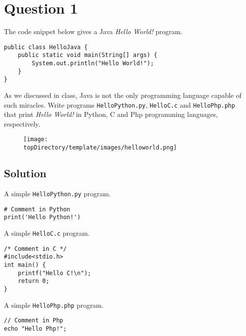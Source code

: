 %
%
%
%

\section*{Question 1}
The code snippet below gives a Java \textit{Hello World!} program.
\lstset{language=Java}
\begin{lstlisting}
public class HelloJava {
	public static void main(String[] args) {
		System.out.println("Hello World!");
	}
}
\end{lstlisting}
As we discussed in class, Java is not the only programming language capable of such miracles. Write programs \texttt{HelloPython.py}, \texttt{HelloC.c} and \texttt{HelloPhp.php} that print \textit{Hello World!} in Python, C and Php programming languages, respectively.
\begin{figure}[H]\centering
\texttt{[image: \\topDirectory/template/images/helloworld.png]}
\end{figure}
\newpage
\subsection*{Solution}
A simple \texttt{HelloPython.py} program.
\lstset{language=Python}
\begin{lstlisting}
# Comment in Python
print('Hello Python!')
\end{lstlisting}
A simple \texttt{HelloC.c} program.
\lstset{language=C}
\begin{lstlisting}
/* Comment in C */
#include<stdio.h>
int main() {
    printf("Hello C!\n");
    return 0;
}
\end{lstlisting}
A simple \texttt{HelloPhp.php} program.
\lstset{language=php}
\begin{lstlisting}
// Comment in Php
echo "Hello Php!";
\end{lstlisting}
